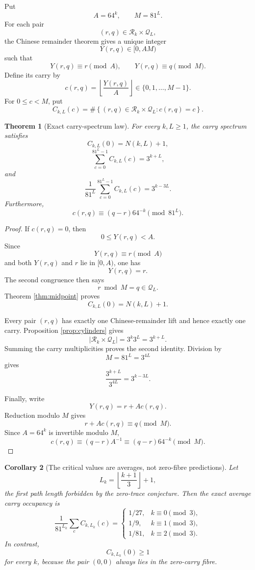 \documentclass[11pt]{article}
\newtheorem{theorem}{Theorem}[section]
\newtheorem{corollary}[theorem]{Corollary}
\theoremstyle{remark}
\newcommand{\Rset}{\mathcal{R}}
\newcommand{\Qset}{\mathcal{Q}}
\begin{document}
Put
\[
A=64^k,
\qquad
M=81^L.
\]
For each pair
\[
(r,q)\in\Rset_k\times\Qset_L,
\]
the Chinese remainder theorem gives a unique integer
\[
Y(r,q)\in[0,AM)
\]
such that
\[
Y(r,q)\equiv r\pmod A,
\qquad
Y(r,q)\equiv q\pmod M.
\]
Define its carry by
\[
c(r,q)=\left\lfloor\frac{Y(r,q)}{A}\right\rfloor
\in\{0,1,\ldots,M-1\}.
\]
For \(0\le c<M\), put
\[
C_{k,L}(c)
=
\#\left\{
(r,q)\in\Rset_k\times\Qset_L:
c(r,q)=c
\right\}.
\]

\begin{theorem}[Exact carry-spectrum law]
\label{thm:carry-law}
For every \(k,L\ge1\), the carry spectrum satisfies
\[
C_{k,L}(0)=N(k,L)+1,
\]
\[
\sum_{c=0}^{81^L-1}C_{k,L}(c)=3^{k+L},
\]
and
\[
\frac{1}{81^L}
\sum_{c=0}^{81^L-1}C_{k,L}(c)
=
3^{k-3L}.
\]
Furthermore,
\[
c(r,q)
\equiv
(q-r)64^{-k}
\pmod{81^L}.
\]
\end{theorem}

\begin{proof}
If \(c(r,q)=0\), then
\[
0\le Y(r,q)<A.
\]
Since
\[
Y(r,q)\equiv r\pmod A
\]
and both \(Y(r,q)\) and \(r\) lie in \([0,A)\), one has
\[
Y(r,q)=r.
\]
The second congruence then says
\[
r\bmod M=q\in\Qset_L.
\]
Theorem \ref{thm:midpoint} proves
\[
C_{k,L}(0)=N(k,L)+1.
\]

Every pair \((r,q)\) has exactly one Chinese-remainder lift and hence exactly one carry.  Proposition \ref{prop:cylinders} gives
\[
|\Rset_k\times\Qset_L|
=
3^k3^L
=
3^{k+L}.
\]
Summing the carry multiplicities proves the second identity.  Division by
\[
M=81^L=3^{4L}
\]
gives
\[
\frac{3^{k+L}}{3^{4L}}
=
3^{k-3L}.
\]

Finally, write
\[
Y(r,q)=r+Ac(r,q).
\]
Reduction modulo \(M\) gives
\[
r+Ac(r,q)\equiv q\pmod M.
\]
Since \(A=64^k\) is invertible modulo \(M\),
\[
c(r,q)
\equiv
(q-r)A^{-1}
\equiv
(q-r)64^{-k}
\pmod M.
\]
\end{proof}

\begin{corollary}[The critical values are averages, not zero-fibre predictions]
\label{cor:critical-mean}
Let
\[
L_k=\left\lfloor\frac{k+1}{3}\right\rfloor+1,
\]
the first path length forbidden by the zero-trace conjecture.  Then the exact average carry occupancy is
\[
\frac1{81^{L_k}}\sum_c C_{k,L_k}(c)
=
\begin{cases}
1/27,&k\equiv0\pmod3,\\
1/9,&k\equiv1\pmod3,\\
1/81,&k\equiv2\pmod3.
\end{cases}
\]
In contrast,
\[
C_{k,L_k}(0)\ge1
\]
for every \(k\), because the pair \((0,0)\) always lies in the zero-carry fibre.
\end{corollary}
\end{document}
